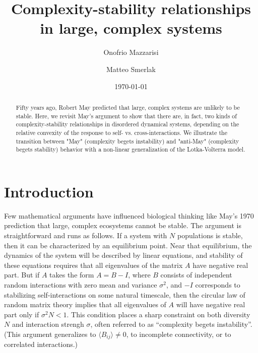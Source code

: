 \documentclass[%
 reprint,
 amsmath,amssymb,
 aps,
]{revtex4-2}
\begin{document}
\title{Complexity-stability relationships in large, complex systems}

\author{Onofrio Mazzarisi}
\author{Matteo Smerlak}



\date{\today}%

\begin{abstract}
Fifty years ago, Robert May predicted that large, complex systems are unlikely to be stable. Here, we revisit May's argument to show that there are, in fact, two kinds of complexity-stability relationships in disordered dynamical systems, depending on the relative convexity of the response to self- vs. cross-interactions. We illustrate the transition between "May" (complexity begets instability) and "anti-May" (complexity begets stability) behavior with a non-linear generalization of the Lotka-Volterra model. 
\end{abstract}


\maketitle

\section{Introduction}

Few mathematical arguments have influenced biological thinking like May's 1970 prediction that large, complex ecosystems cannot be stable. 
The argument is straightforward and runs as follows. 
If a system with $N$ populations is stable, then it can be characterized by an equilibrium point. 
Near that equilibrium, the dynamics of the system will be described by linear equations, and stability of these equations requires that all eigenvalues of the matrix $A$ have negative real part. 
But if $A$ takes the form $A = B - I$, where $B$ consists of independent random interactions with zero mean and variance $\sigma^2$, and $-I$ corresponds to stabilizing self-interactions on some natural timescale, then the circular law of random matrix theory implies that all eigenvalues of $A$ will have negative real part only if $\sigma^2 N < 1$. 
This condition places a sharp constraint on both diversity $N$ and interaction strengh $\sigma$, often referred to as ``complexity begets instability''. 
(This argument generalizes to $\langle B_{ij}\rangle \neq 0$, to incomplete connectivity, or to correlated interactions.)
\end{document}
